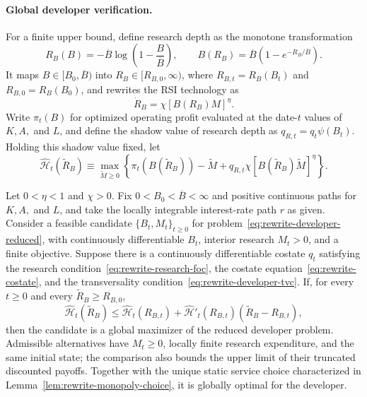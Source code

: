 \paragraph{Global developer verification.}
For a finite upper bound, define research depth as the monotone transformation
\begin{equation}
 R_B(B)=-\overline B\log\left(1-\frac{B}{\overline B}\right),
 \qquad
 B(R_B)=\overline B\left(1-e^{-R_B/\overline B}\right).
 \label{eq:rewrite-research-depth}
\end{equation}
It maps $B\in[B_0,\overline B)$ into
$R_B\in[R_{B,0},\infty)$, where $R_{B,t}=R_B(B_t)$ and
$R_{B,0}=R_B(B_0)$, and rewrites the RSI technology as
\begin{equation}
 \dot R_B=\chi[B(R_B)M]^\eta.
 \label{eq:rewrite-research-depth-law}
\end{equation}
Write $\pi_t(B)$ for optimized operating profit evaluated at the date-$t$
values of $K,A,$ and $L$, and define the shadow value of research depth as
$q_{R,t}=q_t\psi(B_t)$. Holding this shadow value fixed, let
\[
 \widehat{\mathcal H}_t(\widetilde R_B)
 \equiv\max_{\widetilde M\geq0}
 \left\{\pi_t(B(\widetilde R_B))-\widetilde M
 +q_{R,t}\chi[B(\widetilde R_B)\widetilde M]^\eta\right\}.
\]

\begin{lemma}
\label{lem:rewrite-developer-verification}
Let $0<\eta<1$ and $\chi>0$. Fix $0<B_0<\overline B<\infty$
and positive continuous paths for $K,A,$ and $L$,
and take the locally integrable interest-rate path $r$ as given. Consider a
feasible candidate $\{B_t,M_t\}_{t\geq0}$ for
problem~\eqref{eq:rewrite-developer-reduced}, with continuously differentiable
$B_t$, interior research $M_t>0$, and a finite objective. Suppose there is a
continuously differentiable costate $q_t$ satisfying the research
condition~\eqref{eq:rewrite-research-foc}, the costate
equation~\eqref{eq:rewrite-costate}, and the transversality
condition~\eqref{eq:rewrite-developer-tvc}. If, for every $t\geq0$ and every
$\widetilde R_B\geq R_{B,0}$,
\begin{equation}
 \widehat{\mathcal H}_t(\widetilde R_B)
 \leq\widehat{\mathcal H}_t(R_{B,t})
 +\widehat{\mathcal H}'_t(R_{B,t})
 (\widetilde R_B-R_{B,t}),
 \label{eq:rewrite-hamiltonian-support}
\end{equation}
then the candidate is a global maximizer of the reduced developer problem.
Admissible alternatives have $M_t\geq0$, locally finite research expenditure,
and the same initial state; the comparison also bounds the upper limit of
their truncated discounted payoffs.
Together with the unique static service choice characterized in
Lemma~\ref{lem:rewrite-monopoly-choice}, it is globally optimal for the
developer.
\end{lemma}

